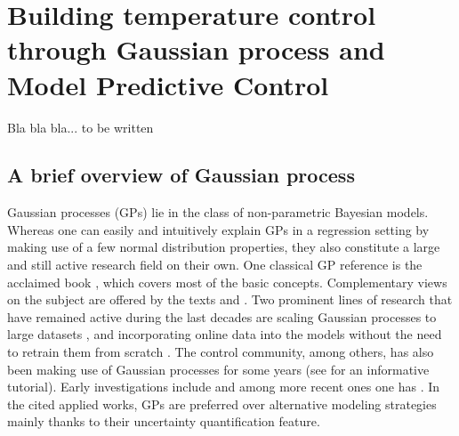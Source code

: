 \cleardoublepage
\chapter{Building temperature control through Gaussian process and Model Predictive Control}

Bla bla bla... to be written

\section{A brief overview of Gaussian process}

Gaussian processes (GPs) lie in the class of non-parametric Bayesian models. Whereas one can easily and intuitively explain GPs in a regression setting by making use of a few normal distribution properties, they also constitute a large and still active research field on their own.
One classical GP reference is the acclaimed book \cite{williams2006gaussian}, which covers most of the basic concepts. Complementary views on the subject are offered by the texts \cite{gramacy2020surrogates} and \cite{kanagawa2018gaussian}.
Two prominent lines of research that have remained active during the last decades are scaling Gaussian processes to large datasets \citep{ferrari1998finite,quinonero2005unifying,yang2012nystrom,bauer2016understanding,bui2017unifying,lederer2021gaussian}, and incorporating online data into the models without the need to retrain them from scratch \citep{csato2002sparse,bui2017streaming,maddox2021conditioning}. The control community, among others, has also been making use of Gaussian processes for some years (see \cite{liu2018gaussian} for an informative tutorial). Early investigations include \cite{kocijan2003predictive,hansen2005nonparametric} and among more recent ones one has \cite{diwale2014optimization,hewing2019cautious,lederer2022cooperative,khosravi2022safety}. In the cited applied works, GPs are preferred over alternative modeling strategies mainly thanks to their uncertainty quantification feature.

